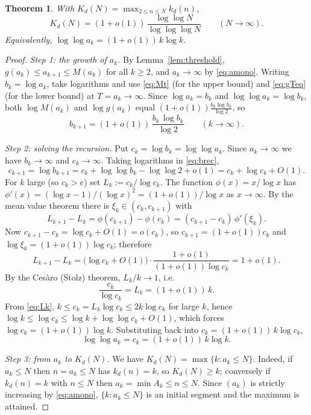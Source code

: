 \documentclass{amsart}
\newtheorem{theorem}{Theorem}
\theoremstyle{definition}
\begin{document}
\begin{theorem}\label{thm:Kd}
With $K_d(N)=\max_{2\le n\le N}k_d(n)$,
\[
K_d(N)=(1+o(1))\,\frac{\log\log N}{\log\log\log N}
\qquad(N\to\infty).
\]
Equivalently, $\log\log a_k=(1+o(1))\,k\log k$.
\end{theorem}

\begin{proof}
\emph{Step 1: the growth of $a_k$.} By Lemma~\ref{lem:threshold},
$g(a_k)\le a_{k+1}\le M(a_k)$ for all $k\ge2$, and $a_k\to\infty$ by
\eqref{eq:amono}. Writing $b_k=\log a_k$, take logarithms and use \eqref{eq:Mt}
(for the upper bound) and \eqref{eq:gTeq} (for the lower bound) at $T=a_k\to
\infty$. Since $\log a_k=b_k$ and $\log\log a_k=\log b_k$, both $\log M(a_k)$
and $\log g(a_k)$ equal $(1+o(1))\frac{b_k\log b_k}{\log2}$, so
\begin{equation}\label{eq:brec}
b_{k+1}=(1+o(1))\,\frac{b_k\,\log b_k}{\log 2}\qquad(k\to\infty).
\end{equation}

\emph{Step 2: solving the recursion.} Put $c_k=\log b_k=\log\log a_k$. Since
$a_k\to\infty$ we have $b_k\to\infty$ and $c_k\to\infty$. Taking logarithms in
\eqref{eq:brec},
\begin{equation}\label{eq:crec}
c_{k+1}=\log b_{k+1}=c_k+\log\log b_k-\log\log2+o(1)=c_k+\log c_k+O(1).
\end{equation}
For $k$ large (so $c_k>e$) set $L_k:=c_k/\log c_k$. The function
$\phi(x)=x/\log x$ has $\phi'(x)=(\log x-1)/(\log x)^2=(1+o(1))/\log x$ as
$x\to\infty$. By the mean value theorem there is $\xi_k\in(c_k,c_{k+1})$ with
\[
L_{k+1}-L_k=\phi(c_{k+1})-\phi(c_k)=(c_{k+1}-c_k)\,\phi'(\xi_k).
\]
Now $c_{k+1}-c_k=\log c_k+O(1)=o(c_k)$, so $c_{k+1}=(1+o(1))c_k$ and
$\log\xi_k=(1+o(1))\log c_k$; therefore
\[
L_{k+1}-L_k=\bigl(\log c_k+O(1)\bigr)\cdot\frac{1+o(1)}{(1+o(1))\log c_k}
=1+o(1).
\]
By the Ces\`aro (Stolz) theorem, $L_k/k\to1$, i.e.
\begin{equation}\label{eq:Lk}
\frac{c_k}{\log c_k}=L_k=(1+o(1))\,k .
\end{equation}
From \eqref{eq:Lk}, $k\le c_k=L_k\log c_k\le 2k\log c_k$ for large $k$, hence
$\log k\le\log c_k\le\log k+\log\log c_k+O(1)$, which forces
$\log c_k=(1+o(1))\log k$. Substituting back into $c_k=(1+o(1))\,k\log c_k$,
\begin{equation}\label{eq:loglogak}
\log\log a_k=c_k=(1+o(1))\,k\log k .
\end{equation}

\emph{Step 3: from $a_k$ to $K_d(N)$.} We have $K_d(N)=\max\{k:a_k\le N\}$.
Indeed, if $a_k\le N$ then $n=a_k\le N$ has $k_d(n)=k$, so $K_d(N)\ge k$;
conversely if $k_d(n)=k$ with $n\le N$ then $a_k=\min A_k\le n\le N$. Since
$(a_k)$ is strictly increasing by \eqref{eq:amono}, $\{k:a_k\le N\}$ is an
initial segment and the maximum is attained.


\end{proof}
\end{document}
